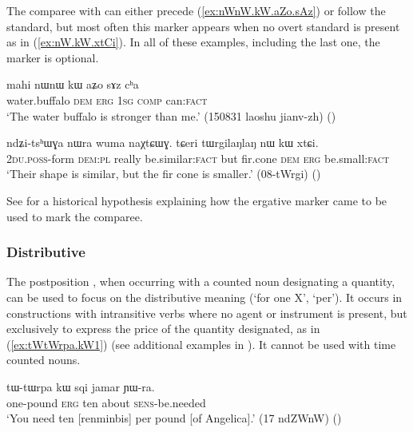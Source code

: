 The comparee with   can either precede (\ref{ex:nWnW.kW.aZo.sAz}) or follow the standard, but most often this marker appears when no overt standard is present as in (\ref{ex:nW.kW.xtCi}). In all of these examples, including the last one, the marker    is optional.

\begin{exe}
\ex \label{ex:nWnW.kW.aZo.sAz}
 \gll mahi nɯnɯ kɯ aʑo sɤz cʰa \\ 
water.buffalo \textsc{dem} \textsc{erg} \textsc{1sg} \textsc{comp} can:\textsc{fact} \\ 
\glt `The water buffalo is stronger than me.'  (150831 laoshu jianv-zh)
()
\end{exe}

\begin{exe}
\ex \label{ex:nW.kW.xtCi}
\gll ndʑi-tsʰɯɣa nɯra wuma naχtɕɯɣ. tɕeri tɯrgilaŋlaŋ nɯ kɯ xtɕi. \\
\textsc{2du}.\textsc{poss}-form \textsc{dem}:\textsc{pl} really be.similar:\textsc{fact} but fir.cone \textsc{dem} \textsc{erg} be.small:\textsc{fact} \\
\glt  `Their shape is similar, but the fir cone is smaller.' (08-tWrgi) ()
\end{exe}

See \citet{jacques16comparative} for a historical hypothesis explaining how the ergative marker came to be used to mark the comparee. 

\subsubsection{Distributive} \label{sec:distributive.kW}
The postposition , when occurring with a counted noun designating a quantity, can be used to focus on the distributive meaning (`for one X', `per'). It occurs in constructions with intransitive verbs where no agent or instrument is present, but exclusively to express the price of the quantity designated, as in  (\ref{ex:tWtWrpa.kW1}) (see additional examples in \citealt[5--6]{jacques16comparative}). It cannot be used with time counted nouns.

 \begin{exe} 
\ex \label{ex:tWtWrpa.kW1}
\gll  tɯ-tɯrpa kɯ sqi jamar ɲɯ-ra. \\
one-pound \textsc{erg} ten about \textsc{sens}-be.needed \\
\glt `You need ten [renminbis] per pound [of Angelica].' (17 ndZWnW)
()
\end{exe}  

